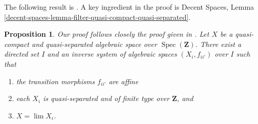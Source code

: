 \documentclass{stacks-project}
\newenvironment{reference}{\comment}{\endcomment}
\theoremstyle{plain}
\newtheorem{proposition}[subsection]{Proposition}
\theoremstyle{definition}
\theoremstyle{remark}
\numberwithin{equation}{subsection}
\def\lim{\mathop{\mathrm{lim}}\nolimits}
\def\Spec{\mathop{\mathrm{Spec}}}
\begin{document}
\noindent
The following result is \cite[Theorem 1.2.2]{CLO}.
A key ingredient in the proof is
Decent Spaces, Lemma
\ref{decent-spaces-lemma-filter-quasi-compact-quasi-separated}.

\begin{proposition}
\label{proposition-approximate}
\begin{reference}
Our proof follows closely the proof given in \cite[Theorem 1.2.2]{CLO}.
\end{reference}
Let $X$ be a quasi-compact and quasi-separated algebraic space over
$\Spec(\mathbf{Z})$. There exist a directed set $I$
and an inverse system of algebraic spaces $(X_i, f_{ii'})$ over $I$
such that
\begin{enumerate}
\item the transition morphisms $f_{ii'}$ are affine
\item each $X_i$ is quasi-separated and of finite type over
$\mathbf{Z}$, and
\item $X = \lim X_i$.
\end{enumerate}
\end{proposition}
\end{document}
